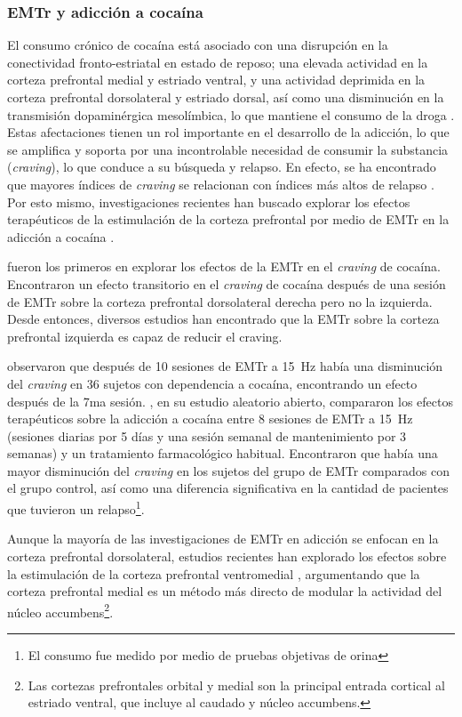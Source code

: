 \subsubsection{EMTr y adicción a cocaína}
El consumo crónico de cocaína está asociado con una disrupción en la conectividad fronto-estriatal en estado de reposo; una elevada actividad en la corteza prefrontal medial y estriado ventral, y una actividad deprimida en la corteza prefrontal dorsolateral y estriado dorsal, así como una disminución en la transmisión dopaminérgica mesolímbica, lo que mantiene el consumo de la droga \parencite{Rachid2018}.
Estas afectaciones tienen un rol importante en el desarrollo de la adicción, lo que se amplifica y soporta por una incontrolable necesidad de consumir la substancia (\textit{craving}), lo que conduce a su búsqueda y relapso.
En efecto, se ha encontrado que mayores índices de \textit{craving} se relacionan con índices más altos de relapso \parencite{Sinha2006,Volkow2000a,Volkow2016}.
Por esto mismo, investigaciones recientes han buscado explorar los efectos terapéuticos de la estimulación de la corteza prefrontal por medio de EMTr en la adicción a cocaína \parencite{Bolloni2018}. \par
\textcite{Camprodon2007} fueron los primeros en explorar los efectos de la EMTr en el \textit{craving} de cocaína.
Encontraron un efecto transitorio en el \textit{craving} de cocaína después de una sesión de EMTr sobre la corteza prefrontal dorsolateral derecha \textemdash{}pero no la izquierda.
Desde entonces, diversos estudios han encontrado que la EMTr sobre la corteza prefrontal izquierda es capaz de reducir el craving.\par
\textcite{Politi2008} observaron que después de 10 sesiones de EMTr a \SI{15}{\hertz} había una disminución del \textit{craving} en 36 sujetos con dependencia a cocaína, encontrando un efecto después de la 7ma sesión.
\textcite{Terraneo2016}, en su estudio aleatorio abierto, compararon los efectos terapéuticos sobre la adicción a cocaína entre 8 sesiones de EMTr a \SI{15}{\hertz} (sesiones diarias por 5 días y una sesión semanal de mantenimiento por 3 semanas) y un tratamiento farmacológico habitual.
Encontraron que había una mayor disminución del \textit{craving} en los sujetos del grupo de EMTr comparados con el grupo control, así como una diferencia significativa en la cantidad de pacientes que tuvieron un relapso\footnote{El consumo fue medido por medio de pruebas objetivas de orina}. \par
Aunque la mayoría de las investigaciones de EMTr en adicción se enfocan en la corteza prefrontal dorsolateral, estudios recientes han explorado los efectos sobre la estimulación de la corteza prefrontal ventromedial \parencite{Hanlon2015,Kearney-Ramos2018a}, argumentando que la corteza prefrontal medial es un método más directo de modular la actividad del núcleo accumbens\footnote{Las cortezas prefrontales orbital y medial son la principal entrada cortical al estriado ventral, que incluye al caudado y núcleo accumbens.}.
